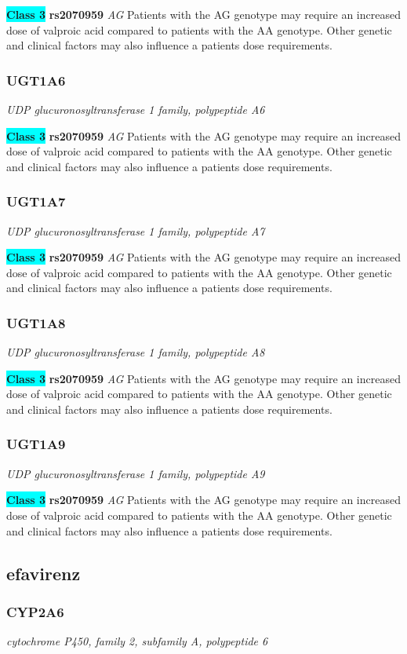 \documentclass{report}
\begin{document}
\textbf{\colorbox{cyan} {Class 3}} \textbf{ rs2070959 } \textit{ AG }
Patients with the AG genotype may require an increased dose of valproic acid compared to patients with the AA genotype. Other genetic and clinical factors may also influence a patients dose requirements.\newline\subsubsection{ UGT1A6 }
\textit{ UDP glucuronosyltransferase 1 family, polypeptide A6 }

\textbf{\colorbox{cyan} {Class 3}} \textbf{ rs2070959 } \textit{ AG }
Patients with the AG genotype may require an increased dose of valproic acid compared to patients with the AA genotype. Other genetic and clinical factors may also influence a patients dose requirements.\newline\subsubsection{ UGT1A7 }
\textit{ UDP glucuronosyltransferase 1 family, polypeptide A7 }

\textbf{\colorbox{cyan} {Class 3}} \textbf{ rs2070959 } \textit{ AG }
Patients with the AG genotype may require an increased dose of valproic acid compared to patients with the AA genotype. Other genetic and clinical factors may also influence a patients dose requirements.\newline\subsubsection{ UGT1A8 }
\textit{ UDP glucuronosyltransferase 1 family, polypeptide A8 }

\textbf{\colorbox{cyan} {Class 3}} \textbf{ rs2070959 } \textit{ AG }
Patients with the AG genotype may require an increased dose of valproic acid compared to patients with the AA genotype. Other genetic and clinical factors may also influence a patients dose requirements.\newline\subsubsection{ UGT1A9 }
\textit{ UDP glucuronosyltransferase 1 family, polypeptide A9 }

\textbf{\colorbox{cyan} {Class 3}} \textbf{ rs2070959 } \textit{ AG }
Patients with the AG genotype may require an increased dose of valproic acid compared to patients with the AA genotype. Other genetic and clinical factors may also influence a patients dose requirements.\newline\subsection{ efavirenz }\subsubsection{ CYP2A6 }
\textit{ cytochrome P450, family 2, subfamily A, polypeptide 6 }
\end{document}
